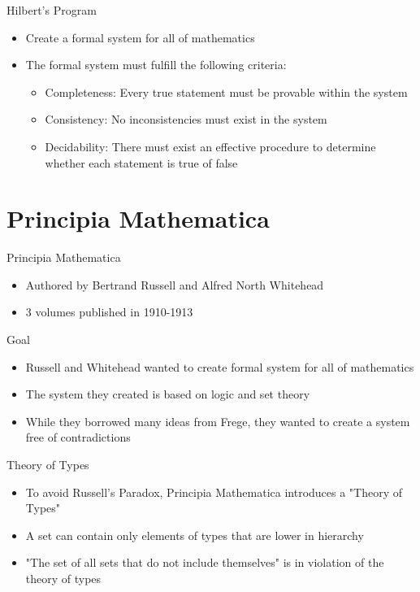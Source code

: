 \documentclass[utf8]{beamer}
\begin{document}
\begin{frame}{Hilbert's Program}
\begin{itemize}
\item Create a formal system for all of mathematics
\item The formal system must fulfill the following criteria:
\begin{itemize}
\item Completeness: Every true statement must be provable within the system
\item Consistency: No inconsistencies must exist in the system
\item Decidability: There must exist an effective procedure to determine whether each statement is true of false
\end{itemize}
\end{itemize}
\end{frame}

\part{Principia Mathematica}
\begin{frame}
\partpage
\end{frame}

\begin{frame}{Principia Mathematica}
\begin{itemize}
\item Authored by Bertrand Russell and Alfred North Whitehead
\item 3 volumes published in 1910-1913
\end{itemize}
\end{frame}

\begin{frame}{Goal}
\begin{itemize}
\item Russell and Whitehead wanted to create formal system for all of mathematics
\item The system they created is based on logic and set theory
\item While they borrowed many ideas from Frege, they wanted to create a system free of contradictions
\end{itemize}
\end{frame}

\begin{frame}{Theory of Types}
\begin{itemize}
\item To avoid Russell's Paradox, Principia Mathematica introduces a "Theory of Types"
\item A set can contain only elements of types that are lower in hierarchy
\item "The set of all sets that do not include themselves" is in violation of the theory of types
\end{itemize}
\end{frame}
\end{document}
